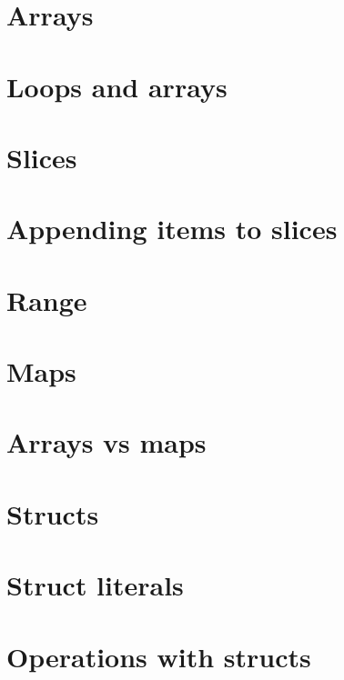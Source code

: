 \documentclass[]{book}
\begin{document}
\hypertarget{arrays}{%
\section{Arrays}\label{arrays}}

\hypertarget{loops-and-arrays}{%
\section{Loops and arrays}\label{loops-and-arrays}}

\hypertarget{slices}{%
\section{Slices}\label{slices}}

\hypertarget{appending-items-to-slices}{%
\section{Appending items to slices}\label{appending-items-to-slices}}

\hypertarget{range}{%
\section{Range}\label{range}}

\hypertarget{maps}{%
\section{Maps}\label{maps}}

\hypertarget{arrays-vs-maps}{%
\section{Arrays vs maps}\label{arrays-vs-maps}}

\hypertarget{structs}{%
\section{Structs}\label{structs}}

\hypertarget{struct-literals}{%
\section{Struct literals}\label{struct-literals}}

\hypertarget{operations-with-structs}{%
\section{Operations with structs}\label{operations-with-structs}}
\end{document}
